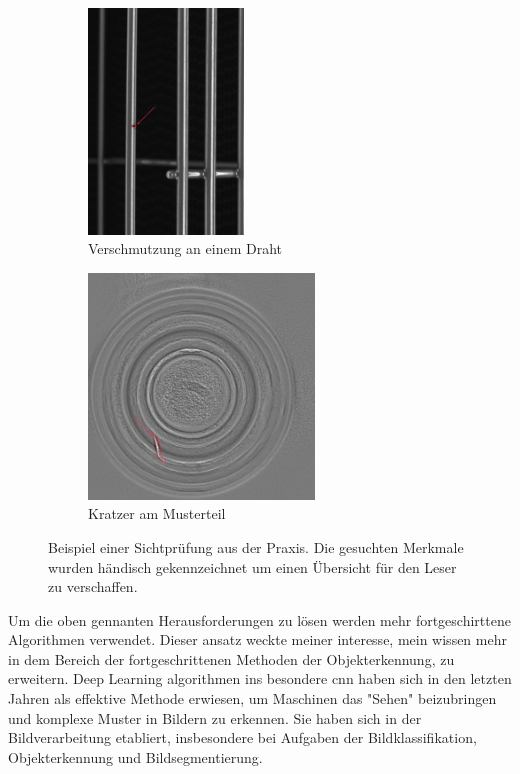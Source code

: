 \begin{figure}[h]

\begin{subfigure}{0.5\textwidth}
\includegraphics[width=0.9\linewidth, height=6cm]{expose/Fehler.jpg} 
\caption{Verschmutzung an einem Draht}
\label{fig:subim1}
\end{subfigure}
\begin{subfigure}{0.5\textwidth}
\includegraphics[width=0.9\linewidth, height=6cm]{expose/Kratzer.jpg}
\caption{Kratzer am Musterteil}
\label{fig:subim2}
\end{subfigure}

\caption{Beispiel einer Sichtprüfung aus der Praxis. Die gesuchten Merkmale wurden händisch gekennzeichnet um einen Übersicht für den Leser zu verschaffen.}

\label{fig:image2}
\end{figure}

Um die oben gennanten Herausforderungen zu lösen werden mehr fortgeschirttene Algorithmen verwendet. Dieser ansatz weckte meiner interesse, mein wissen mehr in dem Bereich der fortgeschrittenen Methoden der Objekterkennung, zu erweitern. Deep Learning algorithmen ins besondere \gls{cnn} haben sich in den letzten Jahren als effektive Methode erwiesen, um Maschinen das "Sehen" beizubringen und komplexe Muster in Bildern zu erkennen. Sie haben sich in der Bildverarbeitung etabliert, insbesondere bei Aufgaben der Bildklassifikation, Objekterkennung und Bildsegmentierung. \citealp{qi_review_2020}\citealp{manakitsa_review_2024}\citealp{kaur_systematic_2024} 


